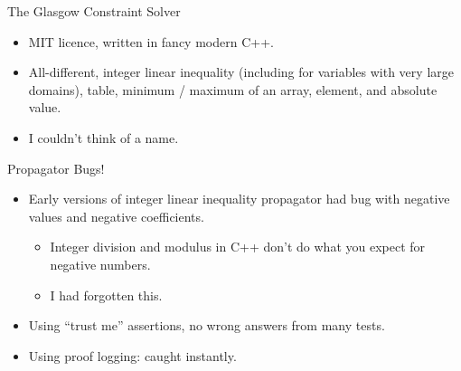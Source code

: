 \documentclass{beamer}
\begin{document}
\begin{frame}{The Glasgow Constraint Solver}
    \begin{center}
        \bigskip
    \end{center}
    \begin{itemize}
        \item MIT licence, written in fancy modern C++.
        \item All-different, integer linear inequality (including for variables
            with very large domains), table, minimum / maximum of an array,
            element, and absolute value.
        \item I couldn't think of a name.
    \end{itemize}
\end{frame}

\begin{frame}{Propagator Bugs!}
    \begin{itemize}
        \item Early versions of integer linear inequality propagator had bug with negative values and negative coefficients.
            \begin{itemize}
                \item Integer division and modulus in C++ don't do what you expect for negative numbers.
                \item I had forgotten this.
            \end{itemize}
        \item Using ``trust me'' assertions, no wrong answers from many tests.
        \item Using proof logging: caught instantly.
    \end{itemize}
\end{frame}
\end{document}
